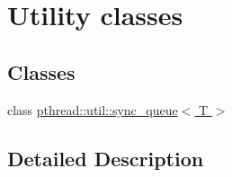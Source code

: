 \hypertarget{group__util}{}\section{Utility classes}
\label{group__util}
\subsection*{Classes}
\begin{DoxyCompactItemize}
\item 
class \hyperlink{classpthread_1_1util_1_1sync__queue}{pthread\+::util\+::sync\+\_\+queue$<$ T $>$}
\end{DoxyCompactItemize}


\subsection{Detailed Description}
